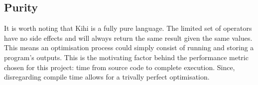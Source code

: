 \subsection{Purity}
It is worth noting that Kihi is a fully pure language. The limited set of operators have no side effects and will always return the same result given the same values. This means an optimisation process could simply consist of running and storing a program's outputs. This is the motivating factor behind the performance metric chosen for this project: time from source code to complete execution. Since, disregarding compile time allows for a trivally perfect optimisation.





